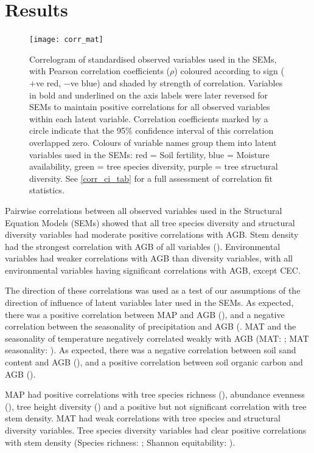 \documentclass[11pt,a4paper]{article}
\begin{document}
\section{Results}

\begin{figure}[H]
\centering
	\texttt{[image: corr\_mat]}
	\caption{Correlogram of standardised observed variables used in the SEMs, with Pearson correlation coefficients ($\rho$) coloured according to sign ($+$ve red, $-$ve blue) and shaded by strength of correlation. Variables in bold and underlined on the axis labels were later reversed for SEMs to maintain positive correlations for all observed variables within each latent variable. Correlation coefficients marked by a circle indicate that the 95\% confidence interval of this correlation overlapped zero. Colours of variable names group them into latent variables used in the SEMs: red = Soil fertility, blue = Moisture availability, green = tree species diversity, purple = tree structural diversity. See \autoref{corr_ci_tab} for a full assessment of correlation fit statistics.}
	\label{corr_mat}
\end{figure}

Pairwise correlations between all observed variables used in the Structural Equation Models (SEMs) showed that all tree species diversity and structural diversity variables had moderate positive correlations with AGB. Stem density had the strongest correlation with AGB of all variables (\ccib{}). Environmental variables had weaker correlations with AGB than diversity variables, with all environmental variables having significant correlations with AGB, except CEC.

The direction of these correlations was used as a test of our assumptions of the direction of influence of latent variables later used in the SEMs. As expected, there was a positive correlation between MAP and AGB (\ccmb{}), and a negative correlation between the seasonality of precipitation and AGB (\ccmcb{}. MAT and the seasonality of temperature negatively correlated weakly with AGB (MAT: \cctb{}; MAT seasonality: \cctcb{}). As expected, there was a negative correlation between soil sand content and AGB (\ccsb{}), and a positive correlation between soil organic carbon and AGB (\ccob{}).

MAP had positive correlations with tree species richness (\ccms{}), abundance evenness (\ccme{}), tree height diversity (\ccmh{}) and a positive but not significant correlation with tree stem density. MAT had weak correlations with tree species and structural diversity variables. Tree species diversity variables had clear positive correlations with stem density (Species richness: \ccsi{}; Shannon equitability: \ccei{}). 
\end{document}
